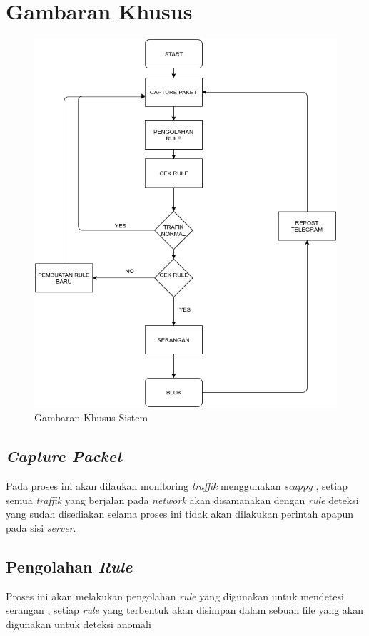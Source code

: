 		
	
\section{Gambaran Khusus}


\begin{figure}[H]
	\centering
	\includegraphics[scale = 0.9 ]{gambar/gambaranKhusus}
	\caption {Gambaran Khusus Sistem}
	\label{Gambaran Khusus Sistem }
\end{figure}

	\subsection{\emph{Capture Packet}}
	Pada proses ini akan dilaukan monitoring \emph{traffik} menggunakan \emph{scappy} , setiap semua \emph{traffik} yang berjalan pada \emph{network} akan disamanakan dengan \emph{rule} deteksi yang sudah disediakan selama proses ini tidak akan dilakukan perintah apapun pada sisi \emph{server}. 

	\subsection{Pengolahan \emph{Rule}}
	Proses ini akan melakukan pengolahan \emph{rule} yang digunakan untuk mendetesi serangan , setiap \emph{rule} yang terbentuk akan disimpan dalam sebuah file yang akan digunakan untuk deteksi anomali
